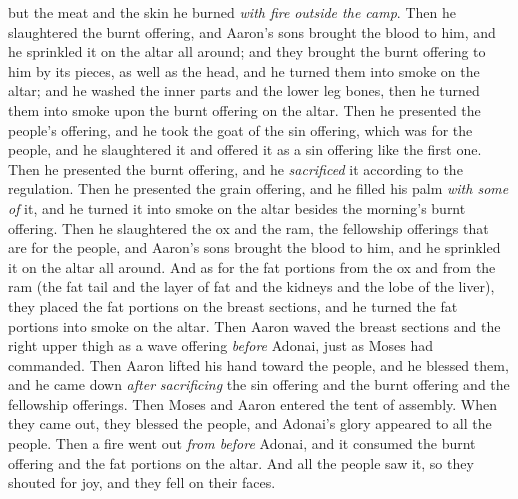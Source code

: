 \begin{biblechapter}
\verse but the meat and the skin he burned \textit{with fire} \textit{outside the camp}.
\verse Then he slaughtered the burnt offering, and Aaron’s sons brought the blood to him, and he sprinkled it on the altar all around;
\verse and they brought the burnt offering to him by its pieces, as well as the head, and he turned them into smoke on the altar;
\verse and he washed the inner parts and the lower leg bones, then he turned them into smoke upon the burnt offering on the altar.
\verse Then he presented the people’s offering, and he took the goat of the sin offering, which was for the people, and he slaughtered it and offered it as a sin offering like the first one.
\verse Then he presented the burnt offering, and he \textit{sacrificed} it according to the regulation.
\verse Then he presented the grain offering, and he filled his palm \textit{with some of} it, and he turned it into smoke on the altar besides the morning’s burnt offering.
\verse Then he slaughtered the ox and the ram, the fellowship offerings that are for the people, and Aaron’s sons brought the blood to him, and he sprinkled it on the altar all around.
\verse And as for the fat portions from the ox and from the ram (the fat tail and the layer of fat and the kidneys and the lobe of the liver),
\verse they placed the fat portions on the breast sections, and he turned the fat portions into smoke on the altar.
\verse Then Aaron waved the breast sections and the right upper thigh as a wave offering \textit{before} Adonai, just as Moses had commanded.
\verse Then Aaron lifted his hand toward the people, and he blessed them, and he came down \textit{after} \textit{sacrificing} the sin offering and the burnt offering and the fellowship offerings.
\verse Then Moses and Aaron entered the tent of assembly. When they came out, they blessed the people, and Adonai’s glory appeared to all the people.
\verse Then a fire went out \textit{from before} Adonai, and it consumed the burnt offering and the fat portions on the altar. And all the people saw it, so they shouted for joy, and they fell on their faces.
\end{biblechapter}

